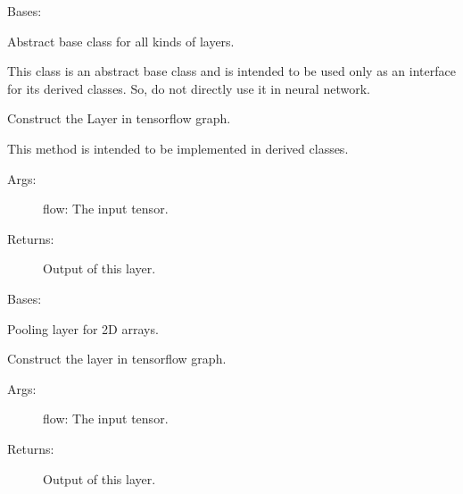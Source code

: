 \documentclass[letterpaper,10pt,english]{sphinxmanual}
\begin{document}

\begin{fulllineitems}
\label{legonet:legonet.layers.Layer}
Bases: {\hyperref[legonet:legonet.topology.Node]{\emph{}}}

Abstract base class for all kinds of layers.

This class is an abstract base class and is intended to be used only as an
interface for its derived classes. So, do not directly use it in neural
network.

\begin{fulllineitems}
\label{legonet:legonet.layers.Layer.call}
Construct the Layer in tensorflow graph.

This method is intended to be implemented in derived classes.
\begin{description}
\item[{Args:}] \leavevmode
flow: The input tensor.

\item[{Returns:}] \leavevmode
Output of this layer.

\end{description}

\end{fulllineitems}


\end{fulllineitems}


\begin{fulllineitems}
\label{legonet:legonet.layers.Pooling}
Bases: {\hyperref[legonet:legonet.layers.Layer]{\emph{}}}

Pooling layer for 2D arrays.

\begin{fulllineitems}
\label{legonet:legonet.layers.Pooling.call}
Construct the layer in tensorflow graph.
\begin{description}
\item[{Args:}] \leavevmode
flow: The input tensor.

\item[{Returns:}] \leavevmode
Output of this layer.

\end{description}

\end{fulllineitems}


\end{fulllineitems}
\end{document}
